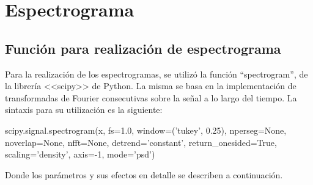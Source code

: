 \documentclass[e2_tp1_main.tex]{subfiles}
\begin{document}
\section{Espectrograma}

\subsection{Funci\'on para realizaci\'on de espectrograma}

Para la realizaci\'on de los espectrogramas, se utiliz\'o la funci\'on ``spectrogram'', de la librer\'ia <<scipy>> de Python. La misma se basa en la implementaci\'on de transformadas de Fourier consecutivas sobre la se\~nal a lo largo del tiempo. La sintaxis para su utilizaci\'on es la siguiente:

\begin{center}
scipy.signal.spectrogram(x, fs=1.0, window=('tukey', 0.25), nperseg=None, noverlap=None, nfft=None, detrend='constant', return\_onesided=True, scaling='density', axis=-1, mode='psd')
\end{center}

Donde los par\'ametros y sus efectos en detalle se describen a continuaci\'on.
\end{document}
